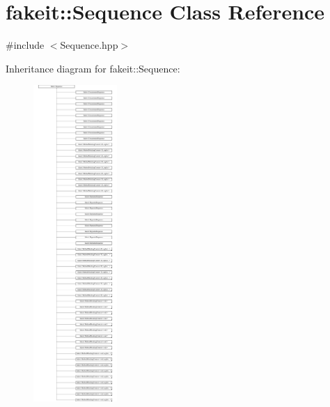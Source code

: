 \hypertarget{classfakeit_1_1Sequence}{}\section{fakeit\+::Sequence Class Reference}
\label{classfakeit_1_1Sequence}


{\ttfamily \#include $<$Sequence.\+hpp$>$}

Inheritance diagram for fakeit\+::Sequence\+:\begin{figure}[H]
\begin{center}
\leavevmode
\includegraphics[height=12.000000cm]{classfakeit_1_1Sequence}
\end{center}
\end{figure}
